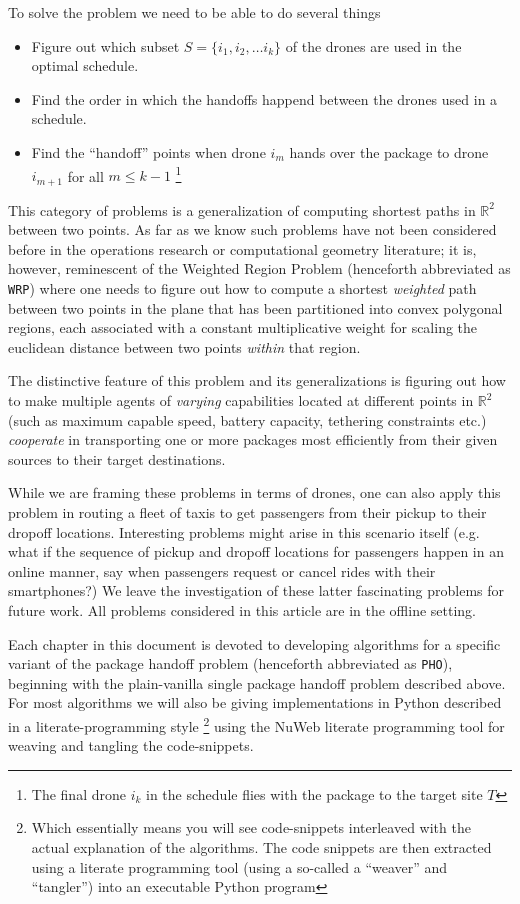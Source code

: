 \documentclass[10.0pt]{report}
\begin{document}
To solve the problem we need to be able to do several things

\begin{itemize}
\item Figure out which subset $S = \{i_1, i_2, \ldots i_k\}$ of the drones are used in the optimal schedule. 
\item Find the order in which the handoffs happend between the drones used in a schedule. 
\item Find the ``handoff'' points when drone $i_m$ hands over the package to drone $i_{m+1}$ for all $m \leq k-1$ 
      \footnote{The final drone $i_k$ in the schedule flies with the package to the target site $T$}
\end{itemize}

This category of problems is a generalization of computing shortest paths in $\mathbb{R}^2$ 
between 
two points. As far as we know such problems have not been considered before in the 
operations research or computational geometry literature; it is, however, reminescent of 
the Weighted Region Problem \cite{mitchell1991weighted} (henceforth abbreviated as 
\texttt{WRP}) where one needs to figure out how to compute a 
shortest \textit{weighted} path between two points in the plane
that has been partitioned into convex polygonal regions, each associated with a constant 
multiplicative weight for scaling the euclidean distance between two points 
\textit{within} that region.  


The distinctive feature of this problem and its generalizations is figuring out how 
to make multiple agents of \textit{varying} capabilities  located at different points 
in $\mathbb{R}^2$ (such as maximum capable speed, battery capacity, tethering constraints 
etc.) \textit{cooperate} in transporting one or more packages most efficiently 
from their given sources to their target destinations. 

While we are framing these problems in terms of drones, one can also apply this problem 
in routing a fleet of taxis to get passengers from their pickup to their dropoff locations. 
Interesting problems might arise in this scenario itself (e.g. what if the sequence of 
pickup and dropoff locations for passengers happen in an online manner, say when passengers request or cancel rides with their 
smartphones?) We leave the investigation of these latter fascinating problems for future work. 
All problems considered in this article are in the offline setting. 


Each chapter in this document is devoted to developing algorithms for a specific 
variant of the package handoff problem (henceforth abbreviated as \texttt{PHO}), beginning 
with the plain-vanilla single package handoff problem described above. 
For most algorithms we will also be giving implementations in Python described in a 
literate-programming style \footnote{Which essentially means you will see code-snippets interleaved with the actual explanation of the algorithms. 
The code snippets are then extracted using a literate programming tool (using a so-called a ``weaver'' and ``tangler'') into an 
executable Python program} \cite{knuth1984literate} using the NuWeb literate programming tool \cite{briggs2001nuweb}  
for weaving and tangling the code-snippets. 
\end{document}
